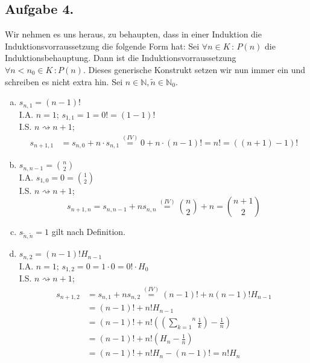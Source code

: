 \documentclass[11pt,a4paper,ngerman]{article}
\begin{document}
\subsection*{Aufgabe 4.}
Wir nehmen es uns heraus, zu behaupten, dass in einer Induktion die Induktionsvorraussetzung
die folgende Form hat:
Sei $\forall n \in K \, : \, P(n)$ die Induktionsbehauptung. Dann ist die Induktionsvorraussetzung
$\forall n < n_0 \in K \, : P(n)$. Dieses generische Konstrukt setzen wir nun immer ein und schreiben
es nicht extra hin. Sei $n \in \mathbb{N}, \tilde{n} \in \mathbb{N}_0$.
\begin{enumerate}[a)]
\item $s_{n,1} = (n-1)!$ \\
I.A. $n=1$; $s_{1,1} = 1 = 0! = (1-1)!$ \\
I.S. $n \rightsquigarrow n+1$;
  \begin{equation*}\begin{split}
    s_{n+1,1} &= s_{n,0} + n \cdot s_{n,1} 
              \stackrel{(IV)}{=} 0 + n \cdot (n-1)! 
              = n! = ((n+1)-1)!
  \end{split}\end{equation*}
\item $s_{n,n-1} = \binom{n}{2}$ \\
I.A. $s_{1,0} = 0 = \binom{1}{2}$ \\
I.S. $n \rightsquigarrow n+1$;
  \begin{equation*}s_{n+1,n} = s_{n,n-1} + n s_{n,n} \stackrel{(IV)}{=} \binom{n}{2} + n = \binom{n+1}{2}\end{equation*}
\item $s_{\tilde{n},\tilde{n}} = 1$ gilt nach Definition.
\item $s_{n,2} = (n-1)! H_{n-1}$ \\
I.A. $n=1$; $s_{1,2} = 0 = 1 \cdot 0 = 0! \cdot H_{0} $ \\
I.S. $n \rightsquigarrow n+1$;
  \begin{equation*}\begin{split}
    s_{n+1,2} &= s_{n,1} + n s_{n,2} \stackrel{(IV)}{=} (n-1)! + n (n-1)! H_{n-1} \\
              &=  (n-1)! + n! H_{n-1}\\
              &= (n-1)! + n! ((\overset{n}{\underset{k=1}{\sum}} \frac{1}{k}) - \frac{1}{n})\\
              &= (n-1)! + n! (H_n - \frac{1}{n})\\
              &= (n-1)! + n!H_n - (n-1)! = n!H_n
  \end{split}\end{equation*}

\end{enumerate}
\end{document}
